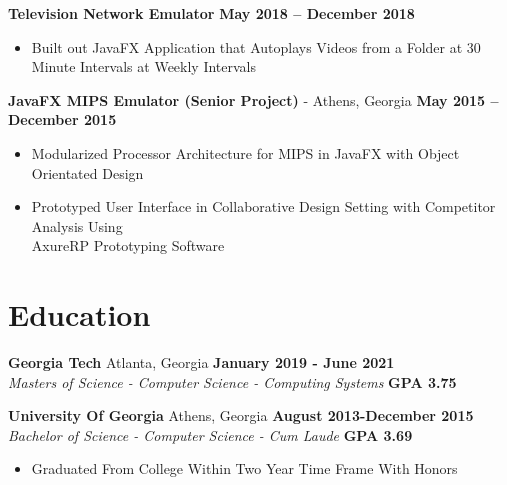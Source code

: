 \documentclass[margin,line]{resume}
\begin{document}
\begin{resume}
	\textbf{Television Network Emulator}  \hfill \textbf{May 2018 -- December 2018}
	\vspace{1mm}
	\begin{itemize}
		\item Built out JavaFX Application that Autoplays Videos from a Folder at 30 Minute Intervals at Weekly Intervals
	\end{itemize}
	
	\textbf{JavaFX MIPS Emulator (Senior Project)} - Athens, Georgia \vspace{1mm} \hfill \textbf{May 2015 -- December 2015}
	\begin{itemize} 
		\item Modularized Processor Architecture for MIPS in JavaFX with Object Orientated Design
		\item Prototyped User Interface in Collaborative Design Setting with Competitor Analysis Using \\
		AxureRP Prototyping Software  
	\end{itemize}
	
	
	\section{\mysidestyle Education}
	
	\textbf{Georgia Tech} Atlanta, Georgia \hfill \textbf{January 2019 - June 2021}\\
	\textsl{Masters of Science - Computer Science - Computing Systems} \hfill \textbf{GPA 3.75} \vspace{2mm}
	
	\textbf{University Of Georgia} Athens, Georgia \hfill \textbf{August 2013-December 2015} \\
	\textsl{Bachelor of Science - Computer Science - Cum Laude} \hfill \textbf{GPA 3.69}\vspace{2mm}
	\begin{itemize}
		\item Graduated From College Within Two Year Time Frame With Honors
	\end{itemize}

	\end{resume}
	
\end{document}
